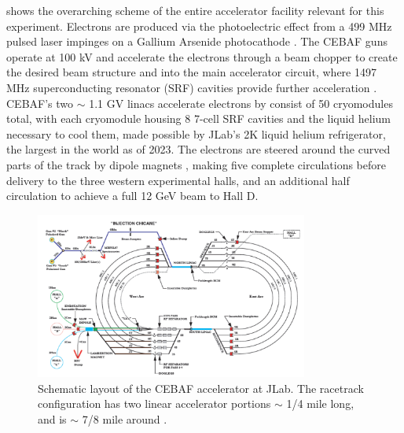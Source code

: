      shows the overarching scheme of the entire accelerator facility relevant for this experiment. Electrons are produced via the photoelectric effect from a 499 MHz pulsed laser impinges on a Gallium Arsenide photocathode . The CEBAF guns operate at 100 kV and accelerate the electrons through a beam chopper  to create the desired beam structure  and into the main accelerator circuit, where 1497 MHz superconducting resonator (SRF) cavities provide further acceleration . CEBAF's two $\sim$ 1.1 GV linacs accelerate electrons by consist of 50 cryomodules total, with each cryomodule housing 8 7-cell SRF cavities and the liquid helium necessary to cool them, made possible by JLab's 2K liquid helium refrigerator, the largest in the world as of 2023. The electrons are steered around the curved parts of the track by dipole magnets , making five complete circulations before delivery to the three western experimental halls, and an additional half circulation to achieve a full 12 GeV beam to Hall D. 
    
    
    \begin{figure}[ht]
        \centering
        \includegraphics[width=0.8\textwidth]{Chapters/Ch2-Experiment/accel_and_beamline/pics/CEBAF/jlab-accelerator-layout.png}
        \caption[JLab Accelerator Schematic]{Schematic layout of the CEBAF accelerator at JLab. The racetrack configuration has two linear accelerator portions $\sim$ 1/4 mile long, and is $\sim$ 7/8 mile around \parencite{Wang2010CEBAFOverview}.}
        \label{fig:jlab_accelerator_layout}
    \end{figure}
    
